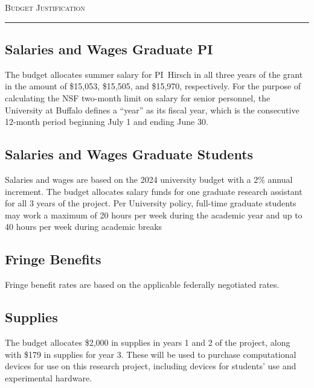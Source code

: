 



\begin{center}
{\LARGE \textsc{Budget Justification}}
\end{center}
\hrule
\vspace{3mm}


\subsection*{Salaries and Wages Graduate PI}
The budget allocates summer salary for PI~Hirsch in all three years of the grant in the amount of \$15,053, \$15,505, and \$15,970, respectively. 
For the purpose of calculating the NSF two-month limit on salary for senior personnel, the University at Buffalo defines a ``year'' as its fiscal year, which is the consecutive 12-month period beginning July 1 and ending June 30.

\subsection*{Salaries and Wages Graduate Students}
Salaries and wages are based on the 2024 university budget with a 2\% annual increment.
The budget allocates salary funds for one graduate research assistant for all 3 years of the project. 
Per University policy, full-time graduate students may work a maximum of 20 hours per week during the academic year and up to 40 hours per week during academic breaks

\subsection*{Fringe Benefits}

Fringe benefit rates are based on the applicable federally negotiated rates.

\subsection*{Supplies}
The budget allocates \$2,000 in supplies in years 1 and 2 of the project, along with \$179 in supplies for year 3.
These will be used to purchase computational devices for use on this research project, including devices for students' use and experimental hardware.

